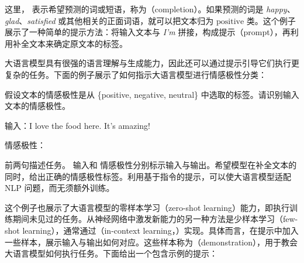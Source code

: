 \noindent 这里，\underline{\hspace{1em}} 表示希望预测的词或短语，称为（completion）。如果预测的词是 \textit{happy}、\textit{glad}、\textit{satisfied} 或其他相关的正面词语，就可以把文本归为 $\mathrm{positive}$ 类。这个例子展示了一种简单的提示方法：将输入文本与 \textit{I'm} 拼接，构成提示（prompt），再利用补全文本来确定原文本的标签。

大语言模型具有很强的语言理解与生成能力，因此还可以通过提示引导它们执行更复杂的任务。下面的例子展示了如何指示大语言模型进行情感极性分类：

\vspace{0.5em}
\begin{tcolorbox}

\begingroup
\setlength{\leftskip}{2em}
\setlength{\rightskip}{2em}

假设文本的情感极性是从 \{positive, negative, neutral\} 中选取的标签。请识别输入文本的情感极性。

\vspace{0.2cm}

{\color{blue} 输入}：I love the food here. It's amazing!

\vspace{0.2cm}

{\color{red} 情感极性}：\underline{\hspace{3em}}

\endgroup

\end{tcolorbox}
\vspace{0.5em}

\noindent 前两句描述任务。{\color{blue} 输入}和{\color{red} 情感极性}分别标示输入与输出。希望模型在补全文本的同时，给出正确的情感极性标签。利用基于指令的提示，可以使大语言模型适配 NLP 问题，而无须额外训练。

这个例子也展示了大语言模型的零样本学习（zero-shot learning）能力，即执行训练期间未见过的任务。从神经网络中激发新能力的另一种方法是少样本学习（few-shot learning），通常通过（in-context learning，）实现。具体而言，在提示中加入一些样本，展示输入与输出如何对应。这些样本称为（demonstration），用于教会大语言模型如何执行任务。下面给出一个包含示例的提示：

